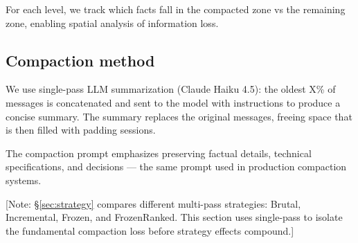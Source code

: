 For each level, we track which facts fall in the compacted zone vs the
remaining zone, enabling spatial analysis of information loss.

\subsection{Compaction method}
\label{sec:compaction-method}

We use single-pass LLM summarization (Claude Haiku 4.5): the oldest X\% of
messages is concatenated and sent to the model with instructions to produce
a concise summary. The summary replaces the original messages, freeing
space that is then filled with padding sessions.

The compaction prompt emphasizes preserving factual details, technical
specifications, and decisions --- the same prompt used in production compaction
systems.

[Note: \S\ref{sec:strategy} compares different multi-pass strategies: Brutal, Incremental,
Frozen, and FrozenRanked. This section uses single-pass to isolate the
fundamental compaction loss before strategy effects compound.]
